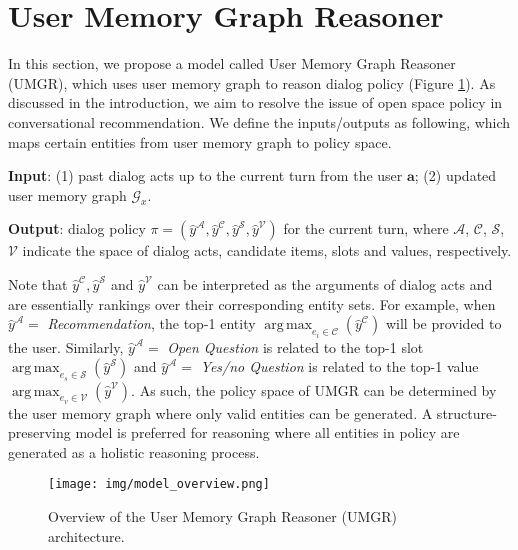 \documentclass[11pt,a4paper]{article}
\DeclareMathOperator*{\argmax}{arg\,max}
\begin{document}
\section{User Memory Graph Reasoner}
\label{sec:umgr}
In this section, we propose a model called User Memory Graph Reasoner (UMGR), which uses user memory graph to reason dialog policy (Figure \ref{fig:model_overview}). 
As discussed in the introduction, we aim to resolve the issue of open space policy in conversational recommendation. 
We define the inputs/outputs as following, which maps certain entities from user memory graph to policy space.

\noindent \textbf{Input}: (1) past dialog acts up to the current turn from the user $\boldsymbol{a}$; (2) updated user memory graph $\mathcal{G}_x$.

\noindent \textbf{Output}: dialog policy $\pi=(\hat{y}^\mathcal{A}, \hat{y}^\mathcal{C}, \hat{y}^\mathcal{S}, \hat{y}^\mathcal{V})$ for the current turn, where $\mathcal{A}$, $\mathcal{C}$, $\mathcal{S}$, $\mathcal{V}$ indicate the space of dialog acts, candidate items, slots and values, respectively.

Note that $\hat{y}^\mathcal{C}, \hat{y}^\mathcal{S}$ and $\hat{y}^\mathcal{V}$ can be interpreted as the arguments of dialog acts and are essentially rankings over their corresponding entity sets.
For example, when $\hat{y}^\mathcal{A}=$ \textit{Recommendation}, the top-1 entity $\argmax_{e_i \in \mathcal{C}}(\hat{y}^\mathcal{C})$ will be provided to the user.
Similarly, $\hat{y}^\mathcal{A}=$ \textit{Open Question} is related to the top-1 slot $\argmax_{e_s \in \mathcal{S}}(\hat{y}^\mathcal{S})$ and $\hat{y}^\mathcal{A}=$ \textit{Yes/no Question} is related to the top-1 value $\argmax_{e_v \in \mathcal{V}}(\hat{y}^\mathcal{V})$.
As such, the policy space of UMGR can be determined by the user memory graph where only valid entities can be generated. A structure-preserving model is preferred for reasoning where all entities in policy are generated as a holistic reasoning process.

\begin{figure}[t]
\centering    
\texttt{[image: img/model\_overview.png]}
    \caption{Overview of the User Memory Graph Reasoner (UMGR) architecture.}
\label{fig:model_overview}
\end{figure}
\end{document}
